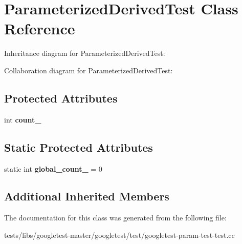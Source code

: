 \hypertarget{classParameterizedDerivedTest}{}\section{Parameterized\+Derived\+Test Class Reference}
\label{classParameterizedDerivedTest}


Inheritance diagram for Parameterized\+Derived\+Test\+:


Collaboration diagram for Parameterized\+Derived\+Test\+:
\subsection*{Protected Attributes}
\begin{DoxyCompactItemize}
\item 
\mbox{\label{classParameterizedDerivedTest_ad8a2968265e7477c13585d17bbd0492c}} 
int {\bfseries count\+\_\+}
\end{DoxyCompactItemize}
\subsection*{Static Protected Attributes}
\begin{DoxyCompactItemize}
\item 
\mbox{\label{classParameterizedDerivedTest_ab6c067a099764a9d58b5f2e8ebcb5d0f}} 
static int {\bfseries global\+\_\+count\+\_\+} = 0
\end{DoxyCompactItemize}
\subsection*{Additional Inherited Members}


The documentation for this class was generated from the following file\+:\begin{DoxyCompactItemize}
\item 
tests/libs/googletest-\/master/googletest/test/googletest-\/param-\/test-\/test.\+cc\end{DoxyCompactItemize}
